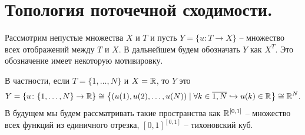 \section{Топология поточечной сходимости.}
\begin{note}
    Рассмотрим непустые множества $X$ и $T$ и пусть $Y = \{u\colon T \to X\}$ -- множество всех отображений между $T$ и $X$.
    В дальнейшем будем обозначать $Y$ как $X^T$.
    Это обозначение имеет некоторую мотивировку.

    В частности, если $T = \{1, \ldots, N\}$ и $X = \mathbb{R}$, то $Y$ это
    \[
        Y = \left\{u\colon \{1, \ldots, N\} \to \mathbb{R}\right\} \cong \left\{(u(1), u(2), \ldots, u(N)) \mid \forall k \in \overline{1, N} \hookrightarrow u(k) \in \mathbb{R} \right\} \cong \mathbb{R}^N.
    \]
    В будущем мы будем рассматривать такие пространства как $\mathbb{R}^{[0, 1]}$ -- множество всех функций из единичного отрезка, $[0, 1]^{[0, 1]}$ -- тихоновский куб.
\end{note}
